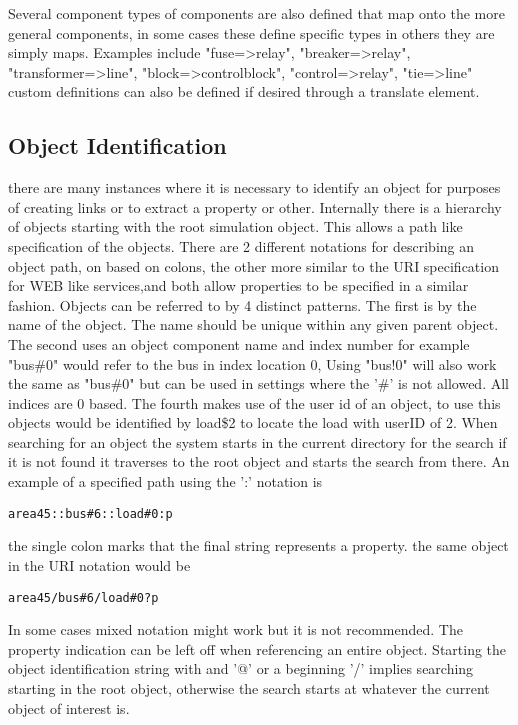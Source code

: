 \documentclass[12pt]{article} %
\begin{document}
Several component types of components are also defined that map onto the more general components,  in some cases these define specific types in others they are simply maps.  Examples include "fuse=>relay", "breaker=>relay",  "transformer=>line",  "block=>controlblock", "control=>relay",  "tie=>line"
custom definitions can also be defined if desired through a translate element.

\subsection{Object Identification}
there are many instances where it is necessary to identify an object for purposes of creating links or to extract a property or other.  Internally there is a hierarchy of objects starting with the root simulation object.  This allows a path like specification of the objects.  There are 2 different notations for describing an object path, on based on colons, the other more similar to the URI specification for WEB like services,and both allow properties to be specified in a similar fashion.  Objects can be referred to by 4 distinct patterns.  The first is by the name of the object.  The name should be unique within any given parent object.  The second uses an object component name and index number for example "bus\#0"  would refer to the bus in index location 0,  Using "bus!0" will also work the same as "bus\#0" but can be used in settings where the '\#' is not allowed.   All indices are 0 based.  The fourth makes use of the user id of an object, to use this objects would be identified by load\$2 to locate the load with userID of 2.  When searching for an object the system starts in the current directory for the search if it is not found it traverses to the root object and starts the search from there.
An example of a specified path using the ':' notation is
\begin{verbatim}
area45::bus#6::load#0:p
\end{verbatim}
the single colon marks that the final string represents a property.
the same object in the URI notation would be
\begin{verbatim}
area45/bus#6/load#0?p
\end{verbatim}
In some cases mixed notation might work but it is not recommended.  The property indication can be left off when referencing an entire object.  Starting the object identification string with and '@' or a beginning '/' implies searching starting in the root object, otherwise the search starts at whatever the current object of interest is.
\end{document}
